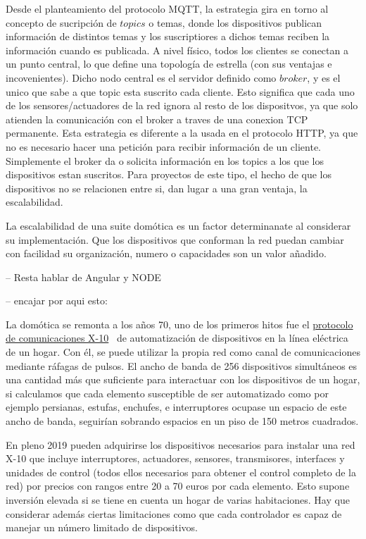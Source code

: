 Desde el planteamiento del protocolo MQTT, la estrategia gira en torno al concepto de sucripción de $topics$ o temas, donde los dispositivos publican información de distintos temas y los suscriptiores a dichos temas reciben la información cuando es publicada. A nivel físico, todos los clientes se conectan a un punto central, lo que define una topología de estrella (con sus ventajas e incovenientes). Dicho nodo central es el servidor definido como $broker$, y es el unico que sabe a que topic esta suscrito cada cliente. Esto significa que cada uno de los sensores/actuadores de la red ignora al resto de los dispositvos, ya que solo atienden la comunicación con el broker a traves de una conexion TCP permanente. Esta estrategia es diferente a la usada en el protocolo HTTP, ya que no es necesario hacer una petición para recibir información de un cliente. Simplemente el broker da o solicita información en los topics a los que los dispositivos estan suscritos. Para proyectos de este tipo, el hecho de que los dispositivos no se relacionen entre si, dan lugar a una gran ventaja, la escalabilidad.

La escalabilidad de una suite domótica es un factor determinanate al considerar su implementación. Que los dispositivos que conforman la red puedan cambiar con facilidad su organización, numero o capacidades son un valor añadido.

-- Resta hablar de Angular y NODE

-- encajar por aqui esto:

La domótica se remonta a los años 70, uno de los primeros hitos fue el \href{https://es.wikipedia.org/wiki/X10}{protocolo de comunicaciones X-10}~\cite{x10protocolwikipedia} de automatización de dispositivos en la línea eléctrica de un hogar. Con él, se puede utilizar la propia red como canal de comunicaciones mediante ráfagas de pulsos. El ancho de banda de 256 dispositivos simultáneos es una cantidad más que suficiente para interactuar con los dispositivos de un hogar, si calculamos que cada elemento susceptible de ser automatizado como por ejemplo persianas, estufas, enchufes, e interruptores ocupase un espacio de este ancho de banda, seguirían sobrando espacios en un piso de 150 metros cuadrados.

En pleno 2019 pueden adquirirse los dispositivos necesarios para instalar una red X-10 que incluye interruptores, actuadores, sensores, transmisores, interfaces y unidades de control (todos ellos necesarios para obtener el control completo de la red) por precios con rangos entre 20 a 70 euros por cada elemento. Esto supone inversión elevada si se tiene en cuenta un hogar de varias habitaciones. Hay que considerar además ciertas limitaciones como que cada controlador es capaz de manejar un número limitado de dispositivos.

